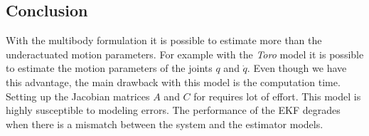 \subsection{Conclusion}
 With the multibody formulation it is possible to estimate more than the underactuated motion parameters. For example with the \emph{Toro} model it is possible to estimate the motion parameters of the joints $q$ and $\dot{q}$. Even though we have this advantage, the main drawback with this model is the computation time. Setting up the Jacobian matrices $A$ and $C$ for requires lot of effort. This model is highly susceptible to modeling errors. The performance of the EKF degrades when there is a mismatch between the system and the estimator models.